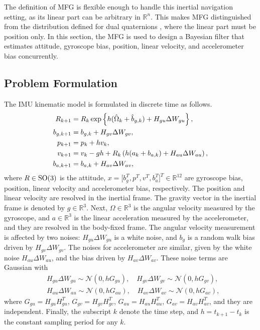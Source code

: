 The definition of MFG is flexible enough to handle this inertial navigation setting, as its linear part can be arbitrary in $\mathbb{R}^n$.
This makes MFG distinguished from the distribution defined for dual quaternions \cite{li2019geometry,li2020unscented}, where the linear part must be position only.
In this section, the MFG is used to design a Bayesian filter that estimates attitude, gyroscope bias, position, linear velocity, and accelerometer bias concurrently.

\subsection{Problem Formulation}

The IMU kinematic model is formulated in discrete time as follows.
\begin{align}
	R_{k+1} &= R_k \exp\left\{  h(\hat{\Omega}_k + \hat{b}_{g,k}) + H_{gu}\Delta W_{gu}  \right\}, \label{eqn:posEst-kinematics-attitude} \\
	b_{g,k+1} &= b_{g,k} + H_{gv}\Delta W_{gv}, \label{eqn:posEst-kinematics-gyrobias} \\
	p_{k+1} &= p_k + hv_k, \label{eqn:posEst-kinematics-pos} \\
	v_{k+1} &= v_k - gh + R_k\left( h(a_k+b_{a,k}) + H_{au}\Delta W_{au} \right), \label{eqn:posEst-kinematics-velocity} \\
	b_{a,k+1} &= b_{a,k} + H_{av}\Delta W_{av}, \label{eqn:posEst-kinematics-accebias}
\end{align}
where $R\in\mathrm{SO}(3)$ is the attitude, $x = \big[b_g^T, p^T, v^T, b_a^T\big]^T \in \mathbb{R}^{12}$ are gyroscope bias, position, linear velocity and accelerometer bias, respectively.
The position and linear velocity are resolved in the inertial frame.
The gravity vector in the inertial frame is denoted by $g\in\mathbb{R}^3$.
Next, $\Omega\in\mathbb{R}^3$ is the angular velocity measured by the gyroscope, and $a\in\mathbb{R}^3$ is the linear acceleration measured by the accelerometer, and they are resolved in the body-fixed frame.
The angular velocity measurement is affected by two noises: $H_{gu}\Delta W_{gu}$ is a white noise, and $b_g$ is a random walk bias driven by $H_{gv}\Delta W_{gv}$.
The noises for accelerometer are similar, given by the white noise $H_{au}\Delta W_{au}$, and the bias driven by $H_{av}\Delta W_{av}$.
These noise terms are Gaussian with
\begin{align}
	&H_{gu}\Delta W_{gu} \sim \mathcal{N}(0,hG_{gu}), \quad H_{gv}\Delta W_{gv} \sim \mathcal{N}(0,hG_{gv}), \label{eqn:posEst-gyroNoise} \\
	&H_{au}\Delta W_{au} \sim \mathcal{N}(0,hG_{au}), \quad H_{av}\Delta W_{av} \sim \mathcal{N}(0,hG_{av}),
\end{align}
where $G_{gu} = H_{gu}H_{gu}^T$, $G_{gv} = H_{gv}H_{gv}^T$, $G_{au} = H_{au}H_{au}^T$, $G_{av} = H_{av}H_{av}^T$, and they are independent.
Finally, the subscript $k$ denote the time step, and $h = t_{k+1}-t_k$ is the constant sampling period for any $k$.


